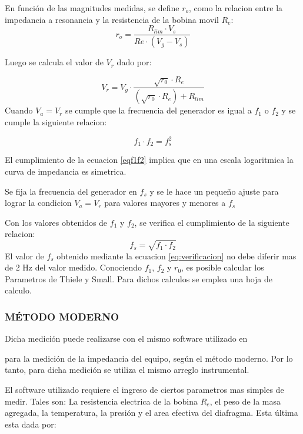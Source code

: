 \documentclass[]{article}
\begin{document}
\begin{multicols}{2}
En función de las magnitudes medidas, se define $r_o$, como la relacion entre
la impedancia a resonancia y la resistencia de la bobina movil $R_e$:
\begin{equation}
  r_{o}=\frac{R_{lim} \cdot V_s}{Re \cdot (V_g-V_s)}
  \label{eq:ro}
\end{equation}

Luego se calcula el valor de $V_r$ dado por:

\begin{equation}
V_r = V_g \cdot \frac{\sqrt{r_0} \cdot R_e }{\left(\sqrt{r_0} \cdot R_e \right) + R_{lim}}
\end{equation}
Cuando $V_a=V_r$ se cumple que la frecuencia del generador es igual a $f_1$ o
 $f_2$  y se cumple la siguiente relacion:

\begin{equation}
  f_1 \cdot f_2 = f_s^2
  \label{eqf1f2}
\end{equation}

El cumplimiento de la ecuacion \ref{eqf1f2}
 implica que en una escala logaritmica
la curva de impedancia es simetrica.

Se fija la frecuencia del generador en $f_s$ y se le hace un pequeño ajuste
para lograr la condicion $V_a=V_r$ para valores mayores y menores a $f_s$

Con los valores obtenidos de $f_1$ y $f_2$, se verifica el cumplimiento de la
siguiente relacion:
\begin{equation}
  f_s=\sqrt{f_1\cdot f_2}
  \label{eq:verificacion}
\end{equation}
El valor de $f_s$ obtenido mediante la ecuacion \ref{eq:verificacion} no debe
diferir mas de 2 Hz del valor medido.
Conociendo $f_1$, $f_2$ y $r_0$, es posible calcular los Parametros de Thiele y
Small. Para dichos calculos se emplea una hoja de calculo.

\subsubsection{MÉTODO MODERNO}
Dicha medición puede realizarse con el mismo software utilizado en


para la medición de la impedancia del equipo, según el
método moderno. Por lo tanto, para dicha medición se utiliza el mismo
arreglo instrumental.

El software utilizado requiere el ingreso de ciertos parametros mas simples
de medir. Tales son: La resistencia electrica de la bobina $R_e$, el peso de
la masa agregada, la temperatura, la presión y el area efectiva del diafragma.
Esta última esta dada por:


\end{multicols}
\end{document}
